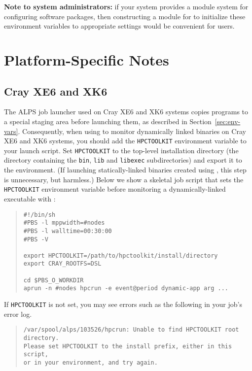 {\bf Note to system administrators:} if your system provides a module system for configuring 
software packages, then constructing
a module for \HPCToolkit{} to initialize these environment variables to appropriate settings
would be convenient for users.

\section{Platform-Specific Notes}

%
%
\subsection{Cray XE6 and XK6}
\label{sec:platform-specific}

The ALPS job launcher used on Cray XE6 and XK6 systems copies 
programs to a special staging area before launching them,
as described in Section~\ref{sec:env-vars}.
Consequently, when using \hpcrun{} to monitor dynamically linked binaries on Cray XE6 and XK6 systems, you
should add the \verb|HPCTOOLKIT| environment variable to your launch
script.  
Set \verb|HPCTOOLKIT| to the top-level \HPCToolkit{} installation directory
(the directory containing the \verb|bin|, \verb|lib| and
\verb|libexec| subdirectories) and export it to the environment.  
(If launching statically-linked binaries created using \hpclink{}, this step is unnecessary, but harmless.)
Below we show a skeletal job script that sets the \verb|HPCTOOLKIT| environment variable  before monitoring 
a dynamically-linked executable with \hpcrun{}: 

\begin{quote}
\begin{verbatim}
#!/bin/sh
#PBS -l mppwidth=#nodes
#PBS -l walltime=00:30:00
#PBS -V

export HPCTOOLKIT=/path/to/hpctoolkit/install/directory
export CRAY_ROOTFS=DSL

cd $PBS_O_WORKDIR
aprun -n #nodes hpcrun -e event@period dynamic-app arg ...
\end{verbatim}
\end{quote}

If \verb|HPCTOOLKIT| is not set, you may see errors such as the
following in your job's error log.

\begin{quote}
\begin{verbatim}
/var/spool/alps/103526/hpcrun: Unable to find HPCTOOLKIT root directory.
Please set HPCTOOLKIT to the install prefix, either in this script,
or in your environment, and try again.
\end{verbatim}
\end{quote}

